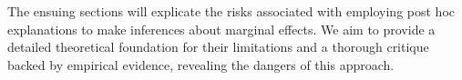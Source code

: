\documentclass[mnsc,blindrev]{informs3}
\begin{document}
The ensuing sections will explicate the risks associated with employing post hoc explanations to make inferences about marginal effects. We aim to provide a detailed theoretical foundation for their limitations and a thorough critique backed by empirical evidence, revealing the dangers of this approach.


     
\end{document}
